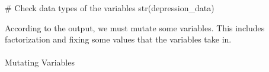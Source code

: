 \documentclass[
  letterpaper,
  DIV=11,
  numbers=noendperiod]{scrartcl}
\makeatletter
\let\oldparagraph\paragraph
\renewcommand{\paragraph}{
    \@ifstar
      \xxxParagraphStar
      \xxxParagraphNoStar
  }
\newcommand{\xxxParagraphStar}[1]{\oldparagraph*{#1}\mbox{}}
\newcommand{\xxxParagraphNoStar}[1]{\oldparagraph{#1}\mbox{}}
\newenvironment{Shaded}{\begin{snugshade}}{\end{snugshade}}
\newcommand{\CommentTok}[1]{\textcolor[rgb]{0.37,0.37,0.37}{#1}}
\newcommand{\FunctionTok}[1]{\textcolor[rgb]{0.28,0.35,0.67}{#1}}
\newcommand{\NormalTok}[1]{\textcolor[rgb]{0.00,0.23,0.31}{#1}}
\newcommand{\OtherTok}[1]{\textcolor[rgb]{0.00,0.23,0.31}{#1}}
\newcommand{\SpecialCharTok}[1]{\textcolor[rgb]{0.37,0.37,0.37}{#1}}
\makeatother
\begin{document}
\begin{Shaded}
\begin{Highlighting}[numbers=left,,]
\CommentTok{\# Check data types of the variables}
\FunctionTok{str}\NormalTok{(depression\_data)}
\end{Highlighting}
\end{Shaded}

According to the output, we must mutate some variables. This includes
factorization and fixing some values that the variables take in.

\paragraph{Mutating Variables}\label{mutating-variables}

\begin{Shaded}
\end{Shaded}
\end{document}
